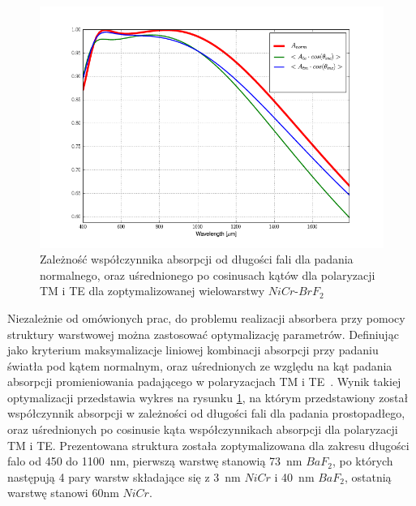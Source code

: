 \begin{figure}[tb]
	\includegraphics[width=\textwidth]{images/pml/optiabsorb.png}
	\caption{Zależność współczynnika absorpcji od długości fali dla padania normalnego, oraz uśrednionego po cosinusach kątów dla polaryzacji TM i TE dla zoptymalizowanej wielowarstwy $NiCr$-$BrF_2$}
	\label{fig:optimulti}
\end{figure}

Niezależnie od omówionych prac, do problemu realizacji absorbera przy pomocy struktury warstwowej można zastosować optymalizację parametrów. Definiując jako kryterium maksymalizacje  liniowej kombinacji absorpcji przy padaniu światła pod kątem normalnym, oraz uśrednionych ze względu na kąt padania absorpcji promieniowania padającego w polaryzacjach TM i TE~\cite{stefaniuk2015perfectly}. Wynik takiej optymalizacji przedstawia wykres na rysunku \ref{fig:optimulti}, na którym przedstawiony został współczynnik absorpcji w zależności od długości fali dla padania prostopadłego, oraz uśrednionych po cosinusie kąta współczynnikach absorpcji dla polaryzacji TM i TE. Prezentowana struktura została zoptymalizowana dla zakresu długości falo od 450 do 1100~nm, pierwszą warstwę stanowią 73~nm $BaF_2$, po których następują 4 pary warstw składające się z 3~nm $NiCr$ i 40~nm $BaF_2$, ostatnią warstwę stanowi 60nm $NiCr$.
